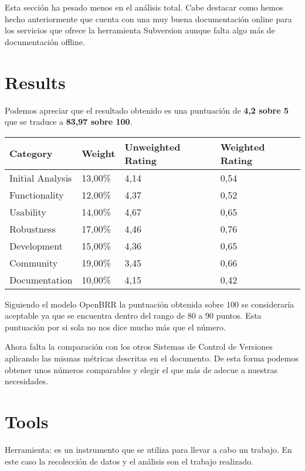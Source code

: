 \documentclass[11pt]{scrartcl}
\begin{document}
\par Esta secci\'on ha pesado menos en el an\'alisis total. Cabe destacar como hemos hecho anteriormente que cuenta con una muy buena documentaci\'on online para los servicios que ofrece la herramienta Subversion aunque falta algo m\'as de documentaci\'on offline.

\section{Results}

Podemos apreciar que el resultado obtenido es una puntuaci\'on de \textbf{4,2 sobre 5} que se traduce a \textbf{83,97 sobre 100}.

\begin{tabular}{|l|l|l|l|}
    \hline {\bf Category} & {\bf Weight} & {\bf Unweighted Rating} & {\bf Weighted Rating}\\
    \hline Initial Analysis	 & 13,00\% & 4,14 & 0,54 \\
    \hline Functionality & 12,00\% & 4,37 & 0,52\\
    \hline Usability & 14,00\% & 4,67 & 0,65\\
    \hline Robustness & 17,00\% & 4,46 & 0,76\\
    \hline Development & 15,00\% & 4,36 & 0,65\\
    \hline Community & 19,00\% & 3,45 & 0,66\\
    \hline Documentation & 10,00\% & 4,15 & 0,42\\
    \hline
\end{tabular}

\par Siguiendo el modelo OpenBRR la puntuaci\'on obtenida sobre 100 se considerar\'ia aceptable ya que se encuentra dentro del rango de 80 a 90 puntos. Esta puntuaci\'on por si sola no nos dice mucho m\'as que el n\'umero.

\par Ahora falta la comparaci\'on con los otros Sistemas de Control de Versiones aplicando las mismas m\'etricas descritas en el documento. De esta forma podemos obtener unos n\'umeros comparables y elegir el que m\'as de adecue a nuestras necesidades.

\section{Tools}

\par Herramienta: es un instrumento que se utiliza para llevar a cabo un trabajo. En este caso la recolecci\'on de datos y el an\'alisis son el trabajo realizado.
\end{document}
